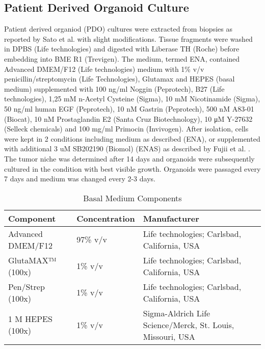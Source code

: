 \begin{flushleft}
\subsection{Patient Derived Organoid Culture}
Patient derived organiod (PDO) cultures were extracted from biopsies as reported by Sato et al. \cite{Sato2011-lh} with slight modifications. Tissue fragments were washed in DPBS (Life technologies) and digested with Liberase TH (Roche) before embedding into BME R1 (Trevigen). The medium, termed ENA, contained Advanced DMEM/F12 (Life technologies) medium with 1\% v/v penicillin/streptomycin (Life Technologies), Glutamax and HEPES (basal medium) supplemented with 100 ng/ml Noggin (Peprotech), B27 (Life technologies), 1,25 mM n-Acetyl Cysteine (Sigma), 10 mM Nicotinamide (Sigma), 50 ng/ml human EGF (Peprotech), 10 nM Gastrin (Peprotech), 500 nM A83-01 (Biocat), 10 nM Prostaglandin E2 (Santa Cruz Biotechnology), 10 μM Y-27632 (Selleck chemicals) and 100 mg/ml Primocin (Invivogen). After isolation, cells were kept in 2 conditions including medium as described (ENA), or supplemented with additional 3 uM SB202190 (Biomol) (ENAS) as described by Fujii et al. \cite{Fujii2016ATumorigenesi  }. 
The tumor niche was determined after 14 days and organoids were subsequently cultured in the condition with best visible growth. 
Organoids were passaged every 7 days and medium was changed every 2-3 days.

\begin{table}[htbp]
\caption{Basal Medium Components}
\label{tab:basal_medium_components}
\begin{tabularx}{\textwidth}{Xll}
\toprule
\textbf{Component} &  \textbf{Concentration} & \textbf{Manufacturer} \\
\midrule
Advanced DMEM/F12 & 97\% v/v & Life technologies; Carlsbad, California, USA \\
GlutaMAX™ (100x) & 1\% v/v & Life technologies; Carlsbad, California, USA \\
Pen/Strep (100x) & 1\% v/v & Life technologies; Carlsbad, California, USA \\
1 M HEPES (100x) & 1\% v/v & Sigma-Aldrich Life Science/Merck, St. Louis, Missouri, USA \\
\bottomrule
\end{tabularx}
\end{table}


\end{flushleft}
